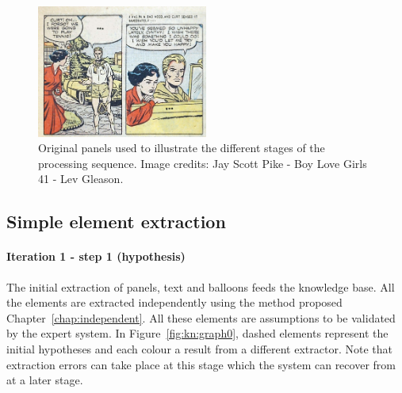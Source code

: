 \begin{figure}[!h]  %
\centering
\includegraphics[width=0.5\textwidth]{process_illustration.jpg}
\caption[Original panels used to illustrate the different stages of the processing sequence]{Original panels used to illustrate the different stages of the processing sequence. Image credits: Jay Scott Pike - Boy Love Girls 41 - Lev Gleason.}
\label{fig:casesExampleReconnaissance}
\end{figure}

\subsection{Simple element extraction} %
\label{sub:simple_element_extraction}

\paragraph{Iteration 1 - step 1 (hypothesis)} %
\label{par:step_1}
The initial extraction of panels, text and balloons feeds the knowledge base.
All the elements are extracted independently using the method proposed Chapter~\ref{chap:independent}.
All these elements are assumptions to be validated by the expert system.
In Figure~\ref{fig:kn:graph0}, dashed elements represent the initial hypotheses and each colour a result from a different extractor.
Note that extraction errors can take place at this stage which the system can recover from at a later stage.


